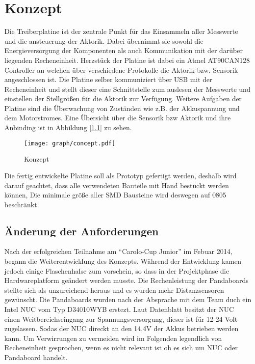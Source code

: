 
\chapter{Konzept}

Die Treiberplatine ist der zentrale Punkt für das Einsammeln aller Messwerte und die ansteuerung der Aktorik. Dabei übernimmt sie sowohl die Energieversorgung der Komponenten als auch
Kommunikation mit der darüber liegenden Recheneinheit. Herzstück der Platine ist dabei ein Atmel AT90CAN128 \textmu Controller an welchen über verschiedene Protokolle die Aktorik bzw. Sensorik
angeschlossen ist. Die Platine selber kommuniziert über USB mit der Recheneinheit und stellt dieser eine Schnittstelle zum auslesen der Messwerte und einstellen der Stellgrößen für die Aktorik
zur Verfügung. Weitere Aufgaben der Platine sind die Überwachung von Zuständen wie z.B. der Akkuspannung und dem Motorstromes. Eine Übersicht über die Sensorik bzw Aktorik und ihre Anbinding ist in 
Abbildung [\ref{fig:konzept}] zu sehen.

\begin{figure}[H]
\centering
\texttt{[image: graph/concept.pdf]}\\
\caption{Konzept}
\label{fig:konzept}
\end{figure}


Die fertig entwickelte Platine soll als Prototyp gefertigt werden, deshalb wird darauf geachtet, dass alle verwendeten Bauteile mit Hand bestückt werden können,
Die minimale größe aller SMD Bausteine wird deswegen auf 0805 beschränkt.


\section{Änderung der Anforderungen}
Nach der erfolgreichen Teilnahme am ``Carolo-Cup Junior'' im Febuar 2014, begann die Weiterentwicklung des Konzepts. Während der Entwicklung kamen jedoch
einige Flaschenhalse zum vorschein, so dass in der Projektphase die Hardwareplatform geändert werden musste. Die Rechenleistung der Pandaboards stellte sich
als unzureichend heraus und es wurden mehr Distanzsensoren gewünscht. Die Pandaboards wurden nach der Absprache mit dem Team duch ein Intel NUC vom Typ
D34010WYB erstezt. Laut Datenblatt \cite{datasheet-nuc} besitzt der NUC einen Weitbereichseingang zur Spannungsversorgung, dieser ist für 12-24 Volt zugelassen.
Sodas der NUC direckt an den 14,4V der Akkus betrieben werden kann.  Um Verwirrungen zu vermeiden wird im Folgenden legendlich von Recheneinheit gesprochen, wenn
es nicht relevant ist ob es sich um NUC oder Pandaboard handelt.






















